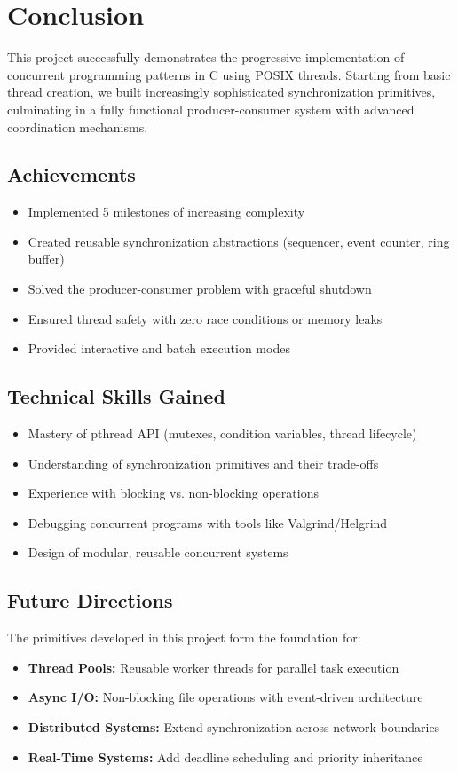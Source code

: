 \documentclass[12pt,a4paper]{article}
\begin{document}
\clearpage

\section{Conclusion}

This project successfully demonstrates the progressive implementation of concurrent programming patterns in C using POSIX threads. Starting from basic thread creation, we built increasingly sophisticated synchronization primitives, culminating in a fully functional producer-consumer system with advanced coordination mechanisms.

\subsection{Achievements}
\begin{itemize}[leftmargin=*]
    \item Implemented 5 milestones of increasing complexity
    \item Created reusable synchronization abstractions (sequencer, event counter, ring buffer)
    \item Solved the producer-consumer problem with graceful shutdown
    \item Ensured thread safety with zero race conditions or memory leaks
    \item Provided interactive and batch execution modes
\end{itemize}

\subsection{Technical Skills Gained}
\begin{itemize}[leftmargin=*]
    \item Mastery of pthread API (mutexes, condition variables, thread lifecycle)
    \item Understanding of synchronization primitives and their trade-offs
    \item Experience with blocking vs. non-blocking operations
    \item Debugging concurrent programs with tools like Valgrind/Helgrind
    \item Design of modular, reusable concurrent systems
\end{itemize}

\subsection{Future Directions}
The primitives developed in this project form the foundation for:
\begin{itemize}[leftmargin=*]
    \item \textbf{Thread Pools:} Reusable worker threads for parallel task execution
    \item \textbf{Async I/O:} Non-blocking file operations with event-driven architecture
    \item \textbf{Distributed Systems:} Extend synchronization across network boundaries
    \item \textbf{Real-Time Systems:} Add deadline scheduling and priority inheritance
\end{itemize}
\end{document}
